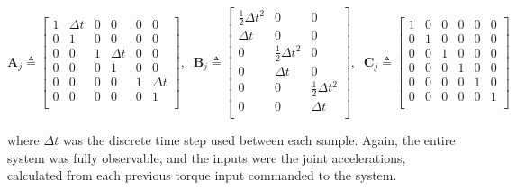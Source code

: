 \[
  \mathbf{A}_{j} \triangleq
  \begin{bmatrix}
    1 & \Delta t & 0 & 0 & 0 & 0\\
    0 & 1 & 0 & 0 & 0 & 0\\
    0 & 0 & 1 & \Delta t & 0 & 0\\
    0 & 0 & 0 & 1 & 0 & 0\\
    0 & 0 & 0 & 0 & 1 & \Delta t\\
    0 & 0 & 0 & 0 & 0 & 1\\
  \end{bmatrix},\;\;
  \mathbf{B}_{j} \triangleq
  \begin{bmatrix}
    \frac{1}{2} \Delta t^{2} & 0 & 0\\
    \Delta t & 0 & 0\\
    0 & \frac{1}{2} \Delta t^{2} & 0\\
    0 & \Delta t & 0\\
    0 & 0 & \frac{1}{2} \Delta t^{2}\\
    0 & 0 & \Delta t\\
  \end{bmatrix},\;\;
  \mathbf{C}_{j} \triangleq
  \begin{bmatrix}
    1 & 0 & 0 & 0 & 0 & 0\\
    0 & 1 & 0 & 0 & 0 & 0\\
    0 & 0 & 1 & 0 & 0 & 0\\
    0 & 0 & 0 & 1 & 0 & 0\\
    0 & 0 & 0 & 0 & 1 & 0\\
    0 & 0 & 0 & 0 & 0 & 1\\
  \end{bmatrix}
\]

\noindent where $\Delta t$ was the discrete time step used between each sample.
Again, the entire system was fully observable, and the inputs were the joint accelerations, calculated from each previous torque input commanded to the system.
